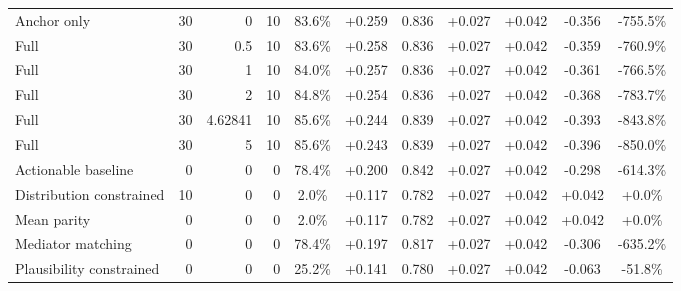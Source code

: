 \begin{table}[htbp]
\begin{tabular}{lrrrccccccc}
Anchor only & 30 & 0 & 10 & 83.6\% & +0.259 & 0.836 & +0.027 & +0.042 & -0.356 & -755.5\% \\
Full & 30 & 0.5 & 10 & 83.6\% & +0.258 & 0.836 & +0.027 & +0.042 & -0.359 & -760.9\% \\
Full & 30 & 1 & 10 & 84.0\% & +0.257 & 0.836 & +0.027 & +0.042 & -0.361 & -766.5\% \\
Full & 30 & 2 & 10 & 84.8\% & +0.254 & 0.836 & +0.027 & +0.042 & -0.368 & -783.7\% \\
Full & 30 & 4.62841 & 10 & 85.6\% & +0.244 & 0.839 & +0.027 & +0.042 & -0.393 & -843.8\% \\
Full & 30 & 5 & 10 & 85.6\% & +0.243 & 0.839 & +0.027 & +0.042 & -0.396 & -850.0\% \\
Actionable baseline & 0 & 0 & 0 & 78.4\% & +0.200 & 0.842 & +0.027 & +0.042 & -0.298 & -614.3\% \\
Distribution constrained & 10 & 0 & 0 & 2.0\% & +0.117 & 0.782 & +0.027 & +0.042 & +0.042 & +0.0\% \\
Mean parity & 0 & 0 & 0 & 2.0\% & +0.117 & 0.782 & +0.027 & +0.042 & +0.042 & +0.0\% \\
Mediator matching & 0 & 0 & 0 & 78.4\% & +0.197 & 0.817 & +0.027 & +0.042 & -0.306 & -635.2\% \\
Plausibility constrained & 0 & 0 & 0 & 25.2\% & +0.141 & 0.780 & +0.027 & +0.042 & -0.063 & -51.8\% \\
\bottomrule
\end{tabular}
\end{table}